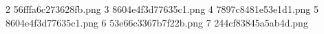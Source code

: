 2 56fffa6c273628fb.png
3 8604e4f3d77635c1.png
4 7897c8481e53e1d1.png
5 8604e4f3d77635c1.png
6 53e66c3367b7f22b.png
7 244cf83845a5ab4d.png
